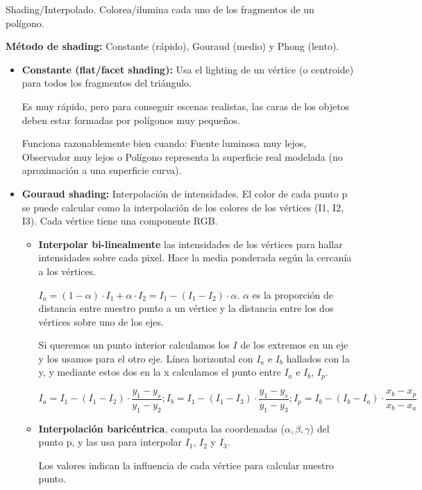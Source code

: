 \begin{enumerate}
    Shading/Interpolado. Colorea/ilumina cada uno de los fragmentos de un polígono.

    \textbf{Método de shading:} Constante (rápido), Gouraud (medio) y Phong (lento).
    \begin{itemize}
        \item \textbf{Constante (flat/facet shading):} Usa el lighting de un vértice (o centroide) para todos los fragmentos del triángulo. 
        
        Es muy rápido, pero para conseguir escenas realistas, las caras de los objetos deben estar formadas por polígonos muy pequeños.

        Funciona razonablemente bien cuando: Fuente luminosa muy lejos, Observador muy lejos o Polígono representa la superficie real modelada (no aproximación a una superficie curva).
        \item \textbf{Gouraud shading:} Interpolación de intensidades. El color de cada punto p se puede calcular como la interpolación de los colores de los vértices (I1, I2, I3). Cada vértice tiene una componente RGB.
        \begin{itemize}
            \item \textbf{Interpolar bi-linealmente} las intensidades de los vértices para hallar intensidades sobre cada pixel. Hace la media ponderada según la cercanía a los vértices.

            $I_a = (1-\alpha) \cdot I_1 + \alpha \cdot I_2 = I_1 - (I_1 - I_2) \cdot \alpha$. $\alpha$ es la proporción de distancia entre nuestro punto a un vértice y la distancia entre los dos vértices sobre uno de los ejes.
    
            Si queremos un punto interior calculamos los $I$ de los extremos en un eje y los usamos para el otro eje. Línea horizontal con $I_a$ e $I_b$ hallados con la y, y mediante estos dos en la x calculamos el punto entre $I_a$ e $I_b$, $I_p$.
            
            $$I_a =  I_1 - (I_1 - I_2) \cdot \frac{y_1-y_s}{y_1 - y_2};
            I_b =  I_1 - (I_1 - I_3) \cdot \frac{y_1-y_s}{y_1 - y_3};
            I_p =  I_b - (I_b - I_a) \cdot \frac{x_b - x_p}{x_b-x_a}$$
    
            \item\textbf{Interpolación baricéntrica}, computa las coordenadas ($\alpha, \beta, \gamma$) del punto p, y las usa para interpolar $I_1$, $I_2$ y $I_3$. 
            
            Los valores indican la influencia de cada vértice para calcular nuestro punto. 
            

\end{itemize}
\end{itemize}
\end{enumerate}
